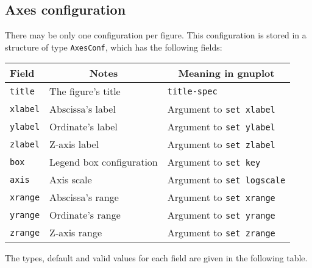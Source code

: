 \documentclass[11pt]{article}
\newcommand{\cmd}[1]{\texttt{#1}}
\begin{document}
\subsection{Axes configuration}

There may be only one configuration per figure. This configuration is stored in
a structure of type \cmd{AxesConf}, which has the following fields:

{\small
\begin{center}
\begin{tabular}{lll}
	\toprule
	\textbf{Field} & \multicolumn{1}{c}{\textbf{Notes}} &
	\multicolumn{1}{c}{\textbf{Meaning in gnuplot}} \\
	\midrule
	\cmd{title} & The figure's title & \cmd{title-spec} \\
	\cmd{xlabel} & Abscissa's label & Argument to \cmd{set xlabel} \\
	\cmd{ylabel} & Ordinate's label & Argument to \cmd{set ylabel} \\
	\cmd{zlabel} & Z-axis label & Argument to \cmd{set zlabel} \\
	\cmd{box} & Legend box configuration & Argument to \cmd{set key} \\
	\cmd{axis} & Axis scale & Argument to \cmd{set logscale} \\
	\cmd{xrange} & Abscissa's range & Argument to \cmd{set xrange} \\
	\cmd{yrange} & Ordinate's range & Argument to \cmd{set yrange} \\
	\cmd{zrange} & Z-axis range & Argument to \cmd{set zrange} \\
	\bottomrule
\end{tabular}
\end{center}}

The types, default and valid values for each field are given in the following
table.
\end{document}
